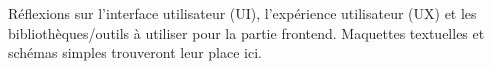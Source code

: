Réflexions sur l'interface utilisateur (UI), l'expérience utilisateur (UX) et les bibliothèques/outils à utiliser pour la partie frontend. Maquettes textuelles et schémas simples trouveront leur place ici.
